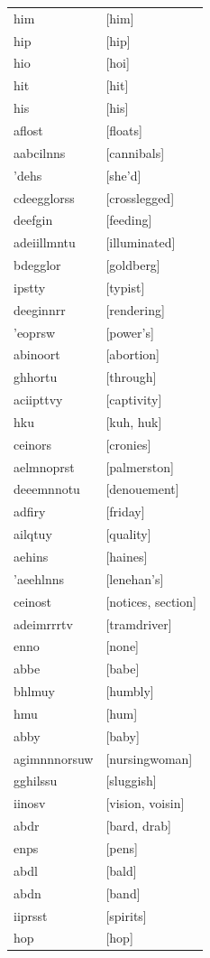 \documentclass{article}
\begin{document}
\begin{tabular}{ll}
him & [him] \\
hip & [hip] \\
hio & [hoi] \\
hit & [hit] \\
his & [his] \\
aflost & [floats] \\
aabcilnns & [cannibals] \\
'dehs & [she'd] \\
cdeegglorss & [crosslegged] \\
deefgin & [feeding] \\
adeiillmntu & [illuminated] \\
bdegglor & [goldberg] \\
ipstty & [typist] \\
deeginnrr & [rendering] \\
'eoprsw & [power's] \\
abinoort & [abortion] \\
ghhortu & [through] \\
aciipttvy & [captivity] \\
hku & [kuh, huk] \\
ceinors & [cronies] \\
aelmnoprst & [palmerston] \\
deeemnnotu & [denouement] \\
adfiry & [friday] \\
ailqtuy & [quality] \\
aehins & [haines] \\
'aeehlnns & [lenehan's] \\
ceinost & [notices, section] \\
adeimrrrtv & [tramdriver] \\
enno & [none] \\
abbe & [babe] \\
bhlmuy & [humbly] \\
hmu & [hum] \\
abby & [baby] \\
agimnnnorsuw & [nursingwoman] \\
gghilssu & [sluggish] \\
iinosv & [vision, voisin] \\
abdr & [bard, drab] \\
enps & [pens] \\
abdl & [bald] \\
abdn & [band] \\
iiprsst & [spirits] \\
hop & [hop] \\

\end{tabular}
\end{document}
